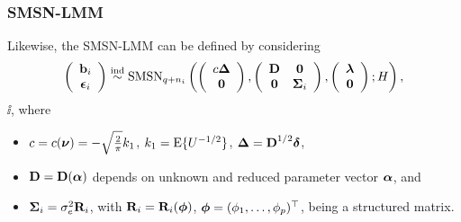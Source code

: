 \begin{frame}\frametitle{SMSN-LMM}
Likewise, the SMSN-LMM can be defined by considering
\begin{equation}\label{modSnmis}
    \left( \begin{array}{c}
         \textbf{b}_i \\
         \mbox{${ \bm \epsilon}$}_i
    \end{array}\right) \stackrel {{\rm ind}}{\sim} \textrm{SMSN}_{q+n_i}
    \left( \left(\begin{array}{c}
         c\mbox{${ \bm \Delta}$} \\
         \mathbf{0}
    \end{array} \right), \left(\begin{array}{cc}
         \mathbf{D} & \mathbf{0} \\
         \mathbf{0} & \mbox{${ \bm \Sigma}$}_i
    \end{array} \right), \left(\begin{array}{c}
         \mbox{${ \bm \lambda}$} \\
         \mathbf{0}
    \end{array} \right); H \right),
\end{equation}
$\ii$, where 
\begin{itemize}
    \item $c= c(\mbox{${ \bm \nu}$})=-\sqrt{\frac{2}{\pi}}k_1$, $k_1=\textrm{E}\{U^{-1/2}\}$, $\mbox{${ \bm \Delta}$} = \textbf{D}^{1/2} \mbox{${ \bm \delta}$}$, 
    \item  $\textbf{D} = \textbf{D}(\mbox{${ \bm \alpha}$})$ depends on unknown and reduced parameter vector $\mbox{${ \bm \alpha}$}$, and
    \item $\mbox{${ \bm \Sigma}$}_i = \sigma_e^2 \mathbf{R}_i$, with $\mathbf{R}_i = \mathbf{R}_i(\mbox{${ \bm \phi}$})$, $\mbox{${ \bm \phi}$}=(\phi_1,\hdots,\phi_p)^\top$, being a structured matrix.
\end{itemize}
\end{frame}

